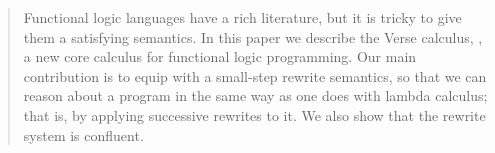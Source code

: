 \documentclass[acmsmall,review]{acmart}\settopmatter{printfolios=true,printccs=false,printacmref=false,authorsperrow=2}
\begin{document}
\begin{abstract}
  Functional logic languages have a rich literature, but it is tricky
  to give them a satisfying semantics.  In this paper we describe the
  Verse calculus, \versecalc{}, a new core calculus for functional
  logic programming. Our main contribution is to equip \versecalc{} with a
  small-step rewrite semantics, so that we can reason
  about a \versecalc{} program in the same way as one does with lambda
  calculus; that is, by applying successive rewrites to it.
  We also show that the rewrite system is confluent.
  \par
  \vspace{1em}
\end{abstract}
\end{document}
